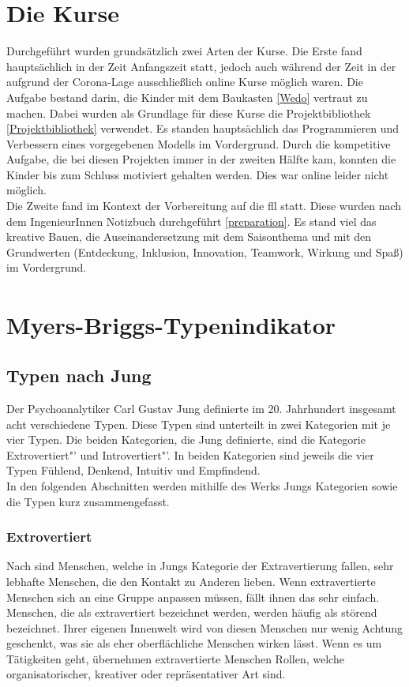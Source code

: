 \section{Die Kurse}
Durchgeführt wurden grundsätzlich zwei Arten der Kurse. Die Erste fand hauptsächlich in der Zeit Anfangszeit statt, jedoch auch während der Zeit in der aufgrund der Corona-Lage ausschließlich online Kurse möglich waren. Die Aufgabe bestand darin, die Kinder mit dem Baukasten \ref{Wedo} vertraut zu machen. Dabei wurden als Grundlage für diese Kurse die Projektbibliothek \ref{Projektbibliothek} verwendet. Es standen hauptsächlich das Programmieren und Verbessern eines vorgegebenen Modells im Vordergrund. Durch die kompetitive Aufgabe, die bei diesen Projekten immer in der zweiten Hälfte kam, konnten die Kinder bis zum Schluss motiviert gehalten werden. Dies war online leider nicht möglich.\\
Die Zweite fand im Kontext der Vorbereitung auf die \acrlong{fll} statt. Diese wurden nach dem IngenieurInnen Notizbuch durchgeführt \ref{preparation}. Es stand viel das kreative Bauen, die Auseinandersetzung mit dem Saisonthema und mit den Grundwerten (Entdeckung, Inklusion, Innovation, Teamwork, Wirkung und Spaß) im Vordergrund. 





\section{Myers-Briggs-Typenindikator\textsuperscript{\textregistered}} 
\subsection{Typen nach Jung}
Der Psychoanalytiker Carl Gustav Jung definierte im 20. Jahrhundert insgesamt acht verschiedene Typen. Diese Typen sind unterteilt in zwei Kategorien mit je vier Typen. Die beiden Kategorien, die Jung definierte, sind die Kategorie \glqq Extrovertiert"' und \glqq Introvertiert"'. In beiden Kategorien sind jeweils die vier Typen Fühlend, Denkend, Intuitiv und Empfindend. \cite{jung_1921}\\

In den folgenden Abschnitten werden mithilfe des Werks  Jungs Kategorien sowie die Typen kurz zusammengefasst.
\subsubsection{Extrovertiert}
Nach \citeauthor{jung_2014} sind Menschen, welche in Jungs Kategorie der Extravertierung
fallen, sehr lebhafte Menschen, die den Kontakt zu Anderen lieben. Wenn extravertierte Menschen sich an eine Gruppe anpassen müssen, fällt ihnen das sehr einfach. Menschen, die als extravertiert bezeichnet werden, werden häufig als störend bezeichnet. Ihrer eigenen Innenwelt wird von diesen Menschen nur wenig Achtung geschenkt, was sie als eher oberflächliche Menschen wirken lässt. Wenn es um Tätigkeiten geht, übernehmen extravertierte Menschen Rollen, welche organisatorischer, kreativer oder repräsentativer Art sind. 

